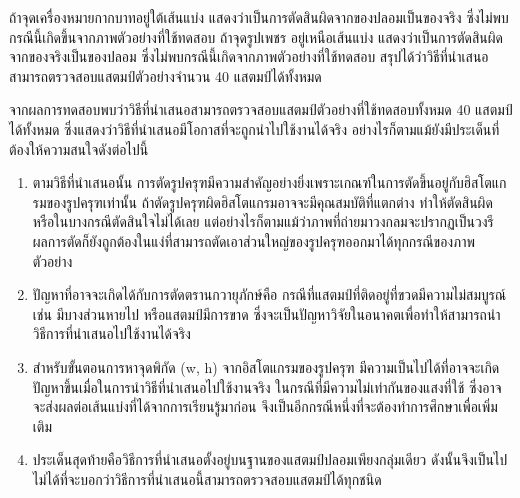 ถ้าจุดเครื่องหมายกากบาทอยู่ใต้เส้นแบ่ง แสดงว่าเป็นการตัดสินผิดจากของปลอมเป็นของจริง ซึ่งไม่พบกรณีนี้เกิดขึ้นจากภาพตัวอย่างที่ใช้ทดสอบ
ถ้าจุดรูปเพชร อยู่เหนือเส้นแบ่ง แสดงว่าเป็นการตัดสินผิดจากของจริงเป็นของปลอม ซึ่งไม่พบกรณีนี้เกิดจากภาพตัวอย่างที่ใช้ทดสอบ
สรุปได้ว่าวิธีที่นำเสนอสามารถตรวจสอบแสตมป์ตัวอย่างจำนวน 40 แสตมป์ได้ทั้งหมด



จากผลการทดสอบพบว่าวิธีที่นำเสนอสามารถตรวจสอบแสตมป์ตัวอย่างที่ใช้ทดสอบทั้งหมด 40 แสตมป์ได้ทั้งหมด ซึ่งแสดงว่าวิธีที่นำเสนอมีโอกาสที่จะถูกนำไปใช้งานได้จริง อย่างไรก็ตามแม้ยังมีประเด็นที่ต้องให้ความสนใจดังต่อไปนี้
\begin{enumerate}
\item ตามวิธีที่นำเสนอนั้น การตัดรูปครุฑมีความสำคัญอย่างยิ่งเพราะเกณฑ์ในการตัดขึ้นอยู่กับฮิสโตแกรมของรูปครุฑเท่านั้น ถ้าตัดรูปครุฑผิดฮิสโตแกรมอาจจะมีคุณสมบัติที่แตกต่าง ทำให้ตัดสินผิด หรือในบางกรณีตัดสินใจไม่ได้เลย   แต่อย่างไรก็ตามแม้ว่าภาพที่ถ่ายมาวงกลมจะปรากฏเป็นวงรี ผลการตัดก็ยังถูกต้องในแง่ที่สามารถตัดเอาส่วนใหญ่ของรูปครุฑออกมาได้ทุกกรณีของภาพตัวอย่าง 
\item ปัญหาที่อาจจะเกิดได้กับการตัดตรานกวายุภักษ์คือ กรณีที่แสตมป์ที่ติดอยู่ที่ขวดมีความไม่สมบูรณ์ เช่น มีบางส่วนหายไป หรือแสตมป์มีการขาด ซึ่งจะเป็นปัญหาวิจัยในอนาคตเพื่อทำให้สามารถนำวิธีการที่นำเสนอไปใช้งานได้จริง
\item สำหรับขั้นตอนการหาจุดพิกัด (w, h) จากอิสโตแกรมของรูปครุฑ มีความเป็นไปได้ที่อาจจะเกิดปัญหาขึ้นเมื่อในการนำวิธีที่นำเสนอไปใช้งานจริง ในกรณีที่มีความไม่เท่ากันของแสงที่ใช้ ซึ่งอาจจะส่งผลต่อเส้นแบ่งที่ได้จากการเรียนรู้มาก่อน จึงเป็นอีกกรณีหนึ่งที่จะต้องทำการศึกษาเพื่อเพิ่มเติม
\item ประเด็นสุดท้ายคือวิธีการที่นำเสนอตั้งอยู่บนฐานของแสตมป์ปลอมเพียงกลุ่มเดียว ดังนั้นจึงเป็นไปไม่ได้ที่จะบอกว่าวิธีการที่นำเสนอนี้สามารถตรวจสอบแสตมป์ได้ทุกชนิด 
\end{enumerate}



 
 







          
           

